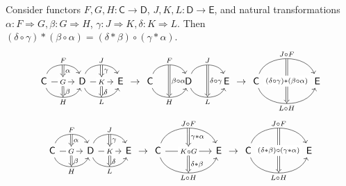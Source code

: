 \begin{lemma} Consider functors $F,G,H:\mathsf{C}\rightarrow \mathsf{D}$, $J,K,L:\mathsf{D}\rightarrow \mathsf{E}$, and natural transformations $\alpha:F\Rightarrow G, \beta:G\Rightarrow H$, $\gamma:J\Rightarrow K, \delta:K\Rightarrow L$. Then $(\delta\circ \gamma)*(\beta\circ \alpha)=(\delta*\beta)\circ (\gamma*\alpha)$.
\begin{equation}
\begin{tikzcd}
\mathsf{C}\arrow[r,bend left=70, "F"{name=f}] \arrow[r, "G"{name=g, description}] \arrow[r,swap, bend right=70, "H"{name=h}] & \mathsf{D}\arrow[Rightarrow, from=f, to=g, "\alpha"] \arrow[Rightarrow, from=g, to=h, "\beta"] \arrow[r,bend left=70, "J"{name=j}] \arrow[r, "K"{name=k, description}] \arrow[r,swap, bend right=70, "L"{name=lfunc}] & \mathsf{E}\arrow[Rightarrow, from=j, to=k, "\gamma"] \arrow[Rightarrow, from=k, to=lfunc, "\delta"]
\end{tikzcd}\rightarrow \begin{tikzcd} \mathsf{C}\arrow[r,bend left=70,"F"{name=f}] \arrow[r,swap, bend right=70, "H"{name=h}]  & \mathsf{D}\arrow[r,bend left=70,"J"{name=j}] \arrow[r,swap, bend right=70, "L"{name=lfunc}]  \arrow[Rightarrow,from=f,to=h,"\beta\circ \alpha"]&\mathsf{E}\arrow[Rightarrow,from=j,to=lfunc,"\delta\circ\gamma"]
\end{tikzcd}\rightarrow\begin{tikzcd}
\mathsf{C}\arrow[rr,bend left=70, "J\circ F"{name=f}] \arrow[rr,swap, bend right=70, "L\circ H"{name=h}] && \mathsf{E}\arrow[Rightarrow, from=f, to=h, "(\delta\circ \gamma)*(\beta\circ \alpha)"{description}]
\end{tikzcd}
\end{equation}
\begin{equation}
\begin{tikzcd}
\mathsf{C}\arrow[r,bend left=70, "F"{name=f}] \arrow[r, "G"{name=g, description}] \arrow[r,swap, bend right=70, "H"{name=h}] & \mathsf{D}\arrow[Rightarrow, from=f, to=g, "\alpha"] \arrow[Rightarrow, from=g, to=h, "\beta"] \arrow[r,bend left=70, "J"{name=j}] \arrow[r, "K"{name=k, description}] \arrow[r,swap, bend right=70, "L"{name=lfunc}] & \mathsf{E}\arrow[Rightarrow, from=j, to=k, "\gamma"] \arrow[Rightarrow, from=k, to=lfunc, "\delta"]
\end{tikzcd}\rightarrow \begin{tikzcd}
\mathsf{C}\arrow[rr,bend left=70, "J\circ F"{name=f}] \arrow[rr, "K\circ G"{name=g, description}] \arrow[rr,swap, bend right=70, "L\circ H"{name=h}] && \mathsf{E}\arrow[Rightarrow, from=f, to=g, "\gamma*\alpha"] \arrow[Rightarrow, from=g, to=h, "\delta*\beta"]
\end{tikzcd}\rightarrow\begin{tikzcd}
\mathsf{C}\arrow[rr,bend left=70, "J\circ F"{name=f}] \arrow[rr,swap, bend right=70, "L\circ H"{name=h}] && \mathsf{E}\arrow[Rightarrow, from=f, to=h, "(\delta*\beta)\circ (\gamma*\alpha)"{description}]
\end{tikzcd}
\end{equation}
\end{lemma}
